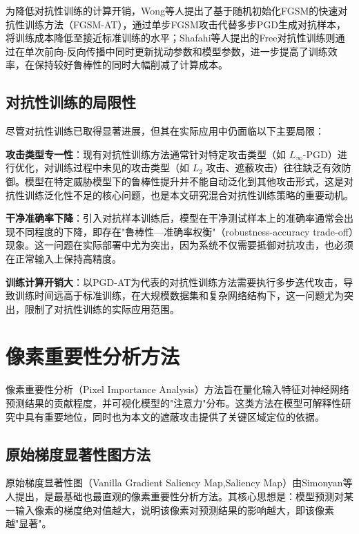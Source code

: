 为降低对抗性训练的计算开销，Wong等人提出了基于随机初始化FGSM的快速对抗性训练方法（FGSM-AT）\cite{wong2020fast}，通过单步FGSM攻击代替多步PGD生成对抗样本，将训练成本降低至接近标准训练的水平；Shafahi等人提出的Free对抗性训练\cite{shafahi2019free}则通过在单次前向-反向传播中同时更新扰动参数和模型参数，进一步提高了训练效率，在保持较好鲁棒性的同时大幅削减了计算成本。

\subsection{对抗性训练的局限性}

尽管对抗性训练已取得显著进展，但其在实际应用中仍面临以下主要局限：

\textbf{攻击类型专一性}：现有对抗性训练方法通常针对特定攻击类型（如 $L_\infty$-PGD）进行优化，对训练过程中未见的攻击类型（如 $L_2$ 攻击、遮蔽攻击）往往缺乏有效防御。模型在特定威胁模型下的鲁棒性提升并不能自动泛化到其他攻击形式，这是对抗性训练泛化性不足的核心问题，也是本文研究混合对抗性训练策略的重要动机。

\textbf{干净准确率下降}：引入对抗样本训练后，模型在干净测试样本上的准确率通常会出现不同程度的下降，即存在"鲁棒性—准确率权衡"（robustness-accuracy trade-off）现象。这一问题在实际部署中尤为突出，因为系统不仅需要抵御对抗攻击，也必须在正常输入上保持高精度。

\textbf{训练计算开销大}：以PGD-AT为代表的对抗性训练方法需要执行多步迭代攻击，导致训练时间远高于标准训练，在大规模数据集和复杂网络结构下，这一问题尤为突出，限制了对抗性训练的实际应用范围。

\section{像素重要性分析方法}

像素重要性分析（Pixel Importance Analysis）方法旨在量化输入特征对神经网络预测结果的贡献程度，并可视化模型的"注意力"分布。这类方法在模型可解释性研究中具有重要地位，同时也为本文的遮蔽攻击提供了关键区域定位的依据。

\subsection{原始梯度显著性图方法}

原始梯度显著性图（Vanilla Gradient  Saliency Map,Saliency Map）由Simonyan等人提出\cite{simonyan2014saliency}，是最基础也最直观的像素重要性分析方法。其核心思想是：模型预测对某一输入像素的梯度绝对值越大，说明该像素对预测结果的影响越大，即该像素越"显著"。

